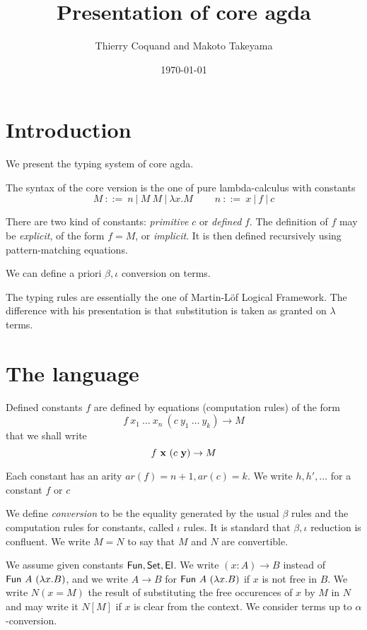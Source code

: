 \documentclass[11pt]{article}
\def\FUN{\hbox{\sf Fun}}
\def\fun{\hbox{\sf fun}}
\def\SET{\hbox{\sf Set}}
\def\EL{\hbox{\sf El}}
\begin{document}
\title{Presentation of core agda}

\author{Thierry Coquand and Makoto Takeyama}
\date{\today}
\maketitle
\title{}

\section*{Introduction}

 We present the typing system of core agda.

 The syntax of the core version is the one of pure lambda-calculus with constants
$$ M ~::=~ n~|~M~M~|~\lambda x.M~~~~~~~~~~n~::=~x~|~f~|~c$$

 There are two kind of constants: {\em primitive} $c$ or {\em defined} $f$. The definition
of $f$ may be {\em explicit}, of the form $f=M$, or {\em implicit}. It is then defined recursively
using pattern-matching equations.

 We can define a priori $\beta,\iota$ conversion on terms.

 The typing rules are essentially the one of Martin-L\"of Logical Framework. 
The difference with his presentation is that substitution is taken as granted on
$\lambda$ terms.

\section{The language}

 Defined constants $f$ are defined by equations (computation rules) of the form
$$f~x_1~\dots~x_n~(c~y_1~\dots~y_k)\rightarrow M$$
that we shall write
$$f~{\bf x}~(c~{\bf y})\rightarrow M$$

 Each constant has an arity $ar(f) = n+1,ar(c)=k$. We write $h,h',\dots$ for a constant $f$ or $c$

 We define {\em conversion} to be the equality generated by the usual $\beta$ rules and
the computation rules for constants, called $\iota$ rules. It is standard that $\beta,\iota$
reduction is confluent. We write $M = N$ to say that $M$ and $N$ are convertible.

 We assume given constants $\FUN,\SET,\EL$. We write $(x{:}A)\rightarrow B$ instead of
$\FUN~A~(\lambda x.B)$, and we write $A\rightarrow B$ for $\FUN~A~(\lambda x.B)$ if $x$
is not free in $B$. %
We write $N(x=M)$ the result of substituting the free occurences of $x$ by $M$ in $N$
and may write it $N[M]$ if $x$ is clear from the context.
We consider terms up to $\alpha$-conversion.
\end{document}
